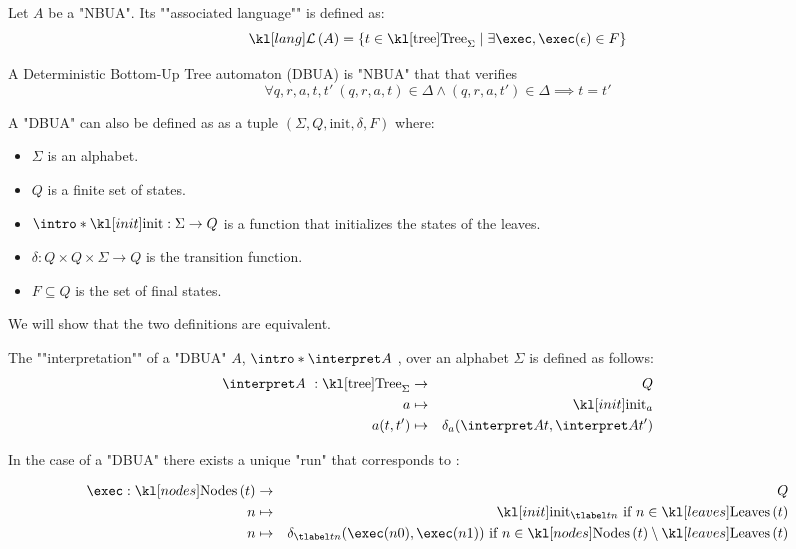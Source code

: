 \documentclass{article}
\begin{document}
\begin{definition}
	Let $A$ be a "NBUA". Its ""associated language"" is defined as:
	\[\lang A = \setdef {t \in \tree_{\Sigma}} {\exists \exec,  \exec (\epsilon) \in F}\]
\end{definition}


\begin{definition}
	A Deterministic Bottom-Up Tree automaton (DBUA) is "NBUA" that that verifies
	\[ \forall q,r,a,t,t' \ (q,r,a,t) \in \Delta \land   (q,r,a,t') \in \Delta  \implies t = t' \]
\end{definition}

\begin{remark}
	A "DBUA" can also be defined as as a tuple $(\Sigma, Q, \text{init}, \delta, F)$ where:
	\begin{itemize}
		\item $\Sigma$ is an alphabet.
		\item $Q$ is a finite set of states.
		\item $\intro *\init : \Sigma \to Q$ is a function that initializes the states of the leaves.
		\item $\delta : Q \times Q \times \Sigma \to Q$ is the transition function.
		\item $F \subseteq Q$ is the set of final states.
	\end{itemize}
	We will show that the two definitions are equivalent.
\end{remark}

\begin{definition}
	The ""interpretation"" of a "DBUA" $A$,  $\intro* \interpret A ~$, over an alphabet $\Sigma$ is defined as follows:
	\begin{eqnarray*}
		\interpret A ~: \tree_{\Sigma} &\to& Q \\
		a &\mapsto& \init_a \\
		a(t,t') &\mapsto& \delta_a (\interpret A t, \interpret A {t'})
	\end{eqnarray*}
\end{definition}

\begin{remark}
	In the case of a "DBUA" there exists a unique "run" that corresponds to :

	\begin{eqnarray*}
		\exec : \nodes t &\to & Q \\
		n  &\mapsto& \init_{\tlabel t n} \text{ if } n \in \leaves t \\
		n  &\mapsto& \delta_{\tlabel t n}(\exec (n0), \exec (n1)) \text{ if } n \in \nodes t \setminus \leaves t
	\end{eqnarray*}
\end{remark}
\end{document}
